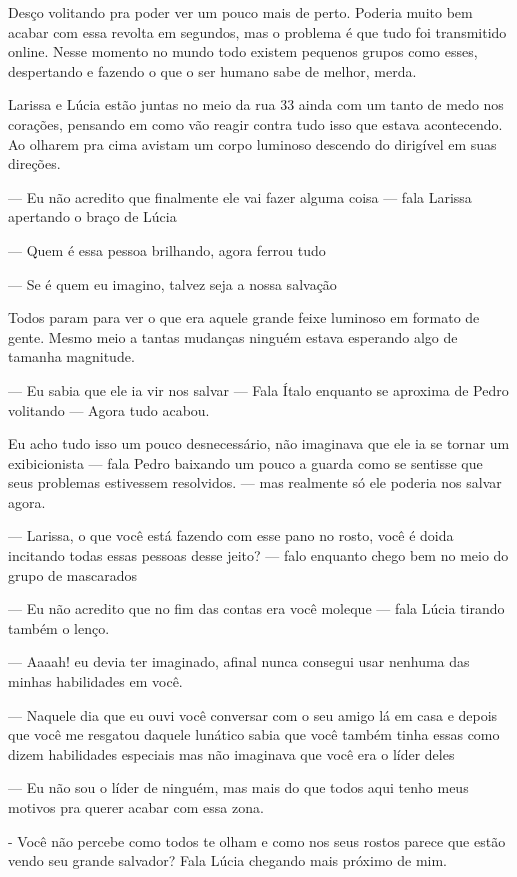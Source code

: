 Desço volitando pra poder ver um pouco mais de perto. Poderia muito bem acabar com essa revolta em segundos, mas o problema é que tudo foi transmitido online. Nesse momento no mundo todo existem pequenos grupos como esses, despertando e fazendo o que o ser humano sabe de melhor, merda.

Larissa e Lúcia estão juntas no meio da rua 33 ainda com um tanto de medo nos corações, pensando em como vão reagir contra tudo isso que estava acontecendo. Ao olharem pra cima avistam um corpo luminoso descendo do dirigível em suas direções.

— Eu não acredito que finalmente ele vai fazer alguma coisa — fala Larissa apertando o braço de Lúcia

— Quem é essa pessoa brilhando, agora ferrou tudo

— Se é quem eu imagino, talvez seja a nossa salvação

Todos param para ver o que era aquele grande feixe luminoso em formato de gente. Mesmo meio a tantas mudanças ninguém estava esperando algo de tamanha magnitude.

— Eu sabia que ele ia vir nos salvar — Fala Ítalo enquanto se aproxima de Pedro volitando — Agora tudo acabou.

Eu acho tudo isso um pouco desnecessário, não imaginava que ele ia se tornar um exibicionista — fala Pedro baixando um pouco a guarda como se sentisse que seus problemas estivessem resolvidos. — mas realmente só ele poderia nos salvar agora.

— Larissa, o que você está fazendo com esse pano no rosto, você é doida incitando todas essas pessoas desse jeito? — falo enquanto chego bem no meio do grupo de mascarados

— Eu não acredito que no fim das contas era você moleque — fala Lúcia tirando também o lenço.

— Aaaah! eu devia ter imaginado, afinal nunca consegui usar nenhuma das minhas habilidades em você.

— Naquele dia que eu ouvi você conversar com o seu amigo lá em casa e depois que você me resgatou daquele lunático sabia que você também tinha essas como dizem habilidades especiais mas não imaginava que você era o líder deles

— Eu não sou o líder de ninguém, mas mais do que todos aqui tenho meus motivos pra querer acabar com essa zona.

- Você não percebe como todos te olham e como nos seus rostos parece que estão vendo seu grande salvador? Fala Lúcia chegando mais próximo de mim.

